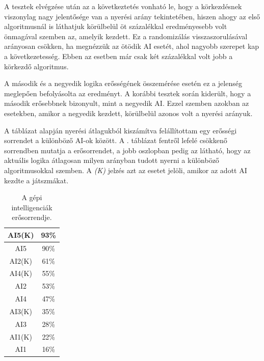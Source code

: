 A tesztek elvégzése után az a következtetés vonható le, hogy a körkezdésnek viszonylag nagy jelentősége van a nyerési arány tekintetében, hiszen ahogy az első algoritmusnál is láthatjuk körülbelül öt százalékkal eredményesebb volt önmagával szemben az, amelyik kezdett. Ez a randomizálás visszaszorulásával arányosan csökken, ha megnézzük az ötödik AI esetét, ahol nagyobb szerepet kap a következetesség. Ebben az esetben már csak két százalékkal volt jobb a körkezdő algoritmus.

A második és a negyedik logika erősségének összemérése esetén ez a jelenség meglepően befolyásolta az eredményt. A korábbi tesztek során kiderült, hogy a második erősebbnek bizonyult, mint a negyedik AI. Ezzel szemben azokban az esetekben, amikor a negyedik kezdett, körülbelül azonos volt a nyerési arányuk.

A táblázat alapján nyerési átlagukból kiszámítva felállítottam egy erősségi sorrendet a különböző AI-ok között. A . táblázat fentről lefelé csökkenő sorrendben mutatja a erősorrendet, a jobb oszlopban pedig az látható, hogy az aktuális logika átlagosan milyen arányban tudott nyerni a különböző algoritmusokkal szemben. A \textit{(K)} jelzés azt az esetet jelöli, amikor az adott AI kezdte a játszmákat.

\begin{table}[h]
\caption{A gépi intelligenciák erősorrendje.}
\label{tab:ai_ranking}
\medskip
\centering
\begin{tabular}{|c|c|} 
 \hline
 AI5(K) & 93\%\\ 
 \hline
 AI5 & 90\%\\ 
 \hline
 AI2(K) & 61\%\\ 
 \hline
 AI4(K) & 55\%\\ 
 \hline
 AI2 & 53\%\\
 \hline
  AI4 & 47\%\\ 
 \hline
 AI3(K) & 35\%\\ 
 \hline
 AI3 & 28\%\\ 
 \hline
 AI1(K) & 22\%\\ 
 \hline
 AI1 & 16\%\\
 \hline
\end{tabular}
\end{table}
